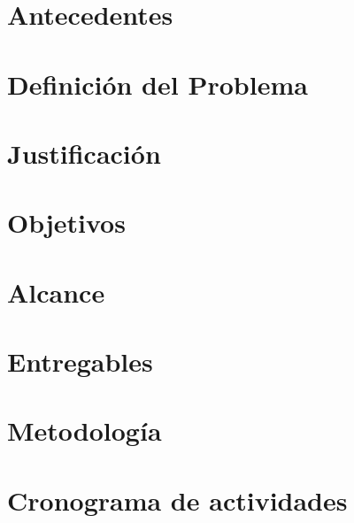 \documentclass[12pt, twoside]{report}
\begin{document}
\chapter{Antecedentes}


\chapter{Definición del Problema}


\chapter{Justificación}


\chapter{Objetivos}


\chapter{Alcance}


\chapter{Entregables}


\chapter{Metodología}


\chapter{Cronograma de actividades}



\end{document}

